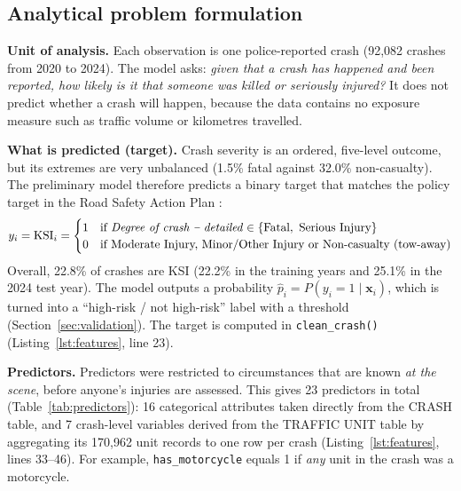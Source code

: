 \documentclass[11pt,a4paper]{article}
\begin{document}
\subsection{Analytical problem formulation}
\label{sec:formulation}

\textbf{Unit of analysis.} Each observation is one police-reported crash (92,082 crashes from 2020 to 2024).
The model asks: \emph{given that a crash has happened and been reported, how likely is it that someone was
killed or seriously injured?} It does not predict whether a crash will happen, because the data contains no
exposure measure such as traffic volume or kilometres travelled.

\textbf{What is predicted (target).} Crash severity is an ordered, five-level outcome, but its extremes are very
unbalanced (1.5\% fatal against 32.0\% non-casualty). The preliminary model therefore predicts a binary target
that matches the policy target in the Road Safety Action Plan \parencite{tfnsw_actionplan}:
\begin{equation}
  y_i = \text{KSI}_i =
  \begin{cases}
    1 & \text{if \emph{Degree of crash -- detailed}} \in \{\text{Fatal},\ \text{Serious Injury}\}\\
    0 & \text{if Moderate Injury, Minor/Other Injury or Non-casualty (tow-away)}
  \end{cases}
  \label{eq:target}
\end{equation}
Overall, 22.8\% of crashes are KSI (22.2\% in the training years and 25.1\% in the 2024 test year). The model
outputs a probability $\hat{p}_i = P(y_i = 1 \mid \mathbf{x}_i)$, which is turned into a \enquote{high-risk / not
high-risk} label with a threshold (Section~\ref{sec:validation}). The target is computed in
\texttt{clean\_crash()} (Listing~\ref{lst:features}, line 23).

\textbf{Predictors.} Predictors were restricted to circumstances that are known \emph{at the scene}, before
anyone's injuries are assessed. This gives 23 predictors in total (Table~\ref{tab:predictors}): 16 categorical
attributes taken directly from the CRASH table, and 7 crash-level variables derived from the TRAFFIC UNIT
table by aggregating its 170,962 unit records to one row per crash (Listing~\ref{lst:features}, lines 33--46).
For example, \texttt{has\_motorcycle} equals 1 if \emph{any} unit in the crash was a motorcycle.
\end{document}
